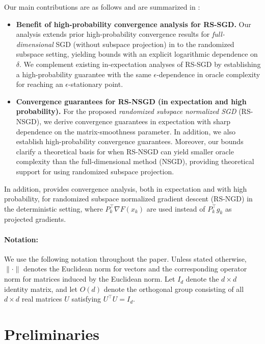 \documentclass[10pt]{article}
\begin{document}
Our main contributions are as follows and are summarized in :
\begin{itemize}
   \item \textbf{Benefit of high-probability convergence analysis for RS-SGD.}
  Our analysis extends prior high-probability convergence results for \emph{full-dimensional} SGD (without subspace projection) in \cite{liu2023hp} to the randomized subspace setting, yielding bounds with an explicit logarithmic dependence on $\delta$.
  We complement existing in-expectation analyses of RS-SGD by establishing a high-probability guarantee with the same $\epsilon$-dependence in oracle complexity for reaching an $\epsilon$-stationary point.

  \item \textbf{Convergence guarantees for RS-NSGD (in expectation and high probability).}
  For the proposed \emph{randomized subspace normalized SGD} (RS-NSGD), we derive convergence guarantees in expectation with sharp dependence on the matrix-smoothness parameter.
  In addition, we also establish high-probability convergence guarantees. Moreover, our bounds clarify a theoretical basis for when RS-NSGD can yield smaller oracle complexity than the full-dimensional method (NSGD), providing theoretical support for using randomized subspace projection.


\end{itemize}
In addition,  provides convergence analysis, both in expectation and with high probability, for randomized subspace normalized gradient descent (RS-NGD) in the deterministic setting, where $P_k^\top \nabla F(x_k)$ are used instead of  $P_k^\top g_k$ as projected gradients.


\paragraph{Notation: }
We use the following notation throughout the paper.
Unless stated otherwise, $\|\cdot\|$ denotes the Euclidean norm for vectors
  and the corresponding operator norm for matrices induced by the Euclidean norm. Let $I_d$ denote the 
$d \times d$ identity matrix, and let
   $O(d)$ denote the orthogonal group consisting of all
  $d \times d$ real matrices $U$ satisfying $U^\top U = I_d$.



 \section{Preliminaries}
\end{document}
